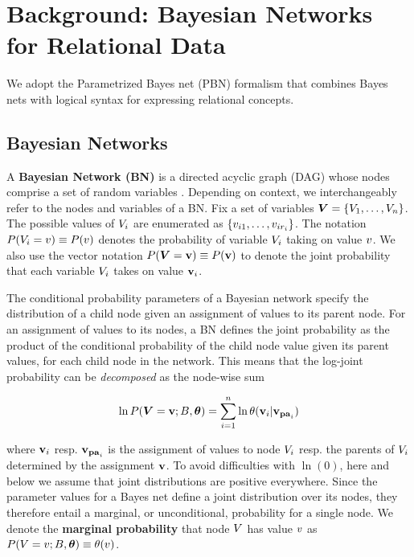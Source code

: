 \documentclass[conference]{IEEEtran}
\begin{document}
\section{Background: Bayesian Networks for Relational Data}
We adopt  
 the Parametrized Bayes net (PBN) formalism \cite{Poole2003} that combines Bayes nets with logical syntax for expressing relational concepts. 

 
\subsection{Bayesian Networks}

A {\bf Bayesian Network (BN)} is a directed acyclic graph (DAG) whose nodes comprise a set of random variables \cite{Pearl1988}. Depending on context, we interchangeably refer to the nodes  and variables of a BN. Fix a set of variables $\boldsymbol{V} = \{V_{1},\ldots,V_{n}\}$. 
The possible values of $V_{i}$ are enumerated as $\{v_{i1},\ldots,v_{ir_{i}}\}$. The notation $P(V_{i} = v)\equiv P(v)$ denotes the probability of variable $V_{i}$ taking on value $v$. We also use the vector notation $P(\boldsymbol{V} = \mathbf{v}) \equiv P(\mathbf{v})$ to denote the joint probability that each variable $V_{i}$ takes on value $\mathbf{v}_{i}$. 


The conditional probability parameters of a Bayesian network specify the distribution of a child node given an assignment of values to its parent node. For an assignment of values to its nodes, a BN defines the joint probability as the product of the conditional probability of the child node value given its parent values, for each child node in the network. This means that the log-joint probability can be {\em decomposed} as the node-wise sum

\begin{equation} \label{eq:bn}
\ln P(\Features = \set{\nodevalue};\model,\parameters) = \sum_{i=1}^{n} \ln \parameter(\set{\nodevalue}_{i}|\set{\nodevalue}_{\parents_{i}})
\end{equation}

where $\mathbf{v}_{i}$ resp. $\mathbf{v}_{\mathbf{pa}_{i}}$ is the assignment of values to node $V_{i}$ resp. the parents of $V_{i}$ determined by the assignment $\mathbf{v}$. 
To avoid difficulties with $\ln(0)$, here and below we assume that joint distributions are positive everywhere. Since the parameter values for a Bayes net define a joint distribution over its nodes, they therefore entail a marginal, or unconditional, probability for a single node. We denote the \textbf{marginal probability} that node $V$ has value $v$ as $P(V = v;B,\boldsymbol{\theta}) \equiv \theta(v)$.
\end{document}
